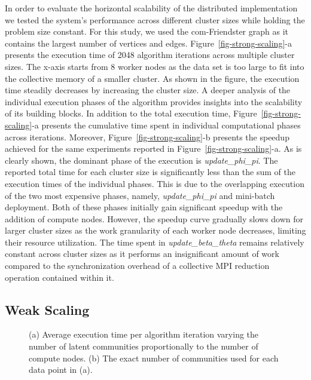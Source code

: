 In order to evaluate the horizontal scalability of the distributed
implementation we tested the system's performance across different cluster
sizes while holding the problem size constant. For this study, we used the
com-Friendster graph as it contains the largest number of vertices and edges.
%
Figure~\ref{fig-strong-scaling}-a presents the execution time of 2048 algorithm
iterations across multiple cluster sizes. The x-axis starts from 8 worker nodes
as the data set is too large to fit into the collective memory of a smaller
cluster.
%
As shown in the figure, the execution
time steadily decreases by increasing the cluster size.
A deeper analysis of the individual execution phases of the algorithm provides
insights into the scalability of its building blocks.
%
In addition to the total execution time, Figure~\ref{fig-strong-scaling}-a
presents the cumulative time spent in individual computational phases across
iterations. Moreover, Figure~\ref{fig-strong-scaling}-b presents the speedup
achieved for the same experiments reported in
Figure~\ref{fig-strong-scaling}-a. As is clearly shown, the dominant phase of
the execution is \textit{update\_phi\_pi}.
The reported total time for each cluster size is significantly less than the
sum of the execution times of the individual phases. This is due to the
overlapping execution of the two most expensive phases, namely,
\textit{update\_phi\_pi} and
mini-batch deployment. Both of these phases initially gain significant speedup with the
addition of compute nodes. However, the speedup curve gradually slows down for
larger cluster sizes as the work granularity of each worker node decreases,
limiting their resource utilization.
%
The time spent in \textit{update\_beta\_theta} remains relatively constant across cluster sizes
as it performs an insignificant amount of work compared to the synchronization
overhead of a collective MPI reduction operation contained within it.

\subsection{Weak Scaling}

\begin{figure}[b] %
  \centering
  \caption{(a) Average execution time per algorithm iteration varying
  the number of latent communities proportionally to the number of compute
  nodes. (b) The exact number of communities used for each data point in (a).}
  \label{fig-weak-scaling}
\end{figure}

